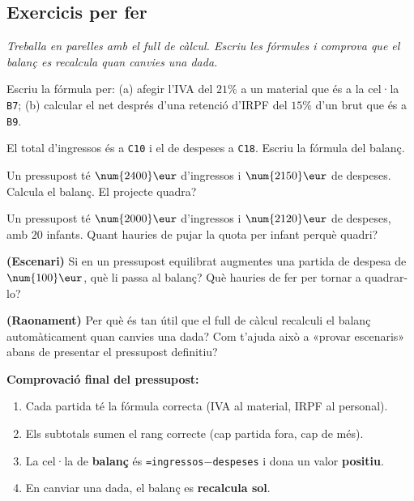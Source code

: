 \subsection{Exercicis per fer}

\noindent\textit{Treballa en parelles amb el full de càlcul. Escriu les fórmules i
comprova que el balanç es recalcula quan canvies una dada.}

\begin{exercicis}
\begin{exlist}
  \item Escriu la fórmula per: (a) afegir l'IVA del $21\%$ a un material que és a la
        cel·la \texttt{B7}; (b) calcular el net després d'una retenció d'IRPF del
        $15\%$ d'un brut que és a \texttt{B9}.
  \item El total d'ingressos és a \texttt{C10} i el de despeses a \texttt{C18}. Escriu
        la fórmula del balanç.
  \item Un pressupost té $\num{2400}\eur$ d'ingressos i $\num{2150}\eur$ de despeses.
        Calcula el balanç. El projecte quadra?
  \item Un pressupost té $\num{2000}\eur$ d'ingressos i $\num{2120}\eur$ de despeses,
        amb $20$ infants. Quant hauries de pujar la quota per infant perquè quadri?
  \item \textbf{(Escenari)} Si en un pressupost equilibrat augmentes una partida de
        despesa de $\num{100}\eur$, què li passa al balanç? Què hauries de fer per
        tornar a quadrar-lo?
  \item \textbf{(Raonament)} Per què és tan útil que el full de càlcul recalculi el
        balanç automàticament quan canvies una dada? Com t'ajuda això a «provar
        escenaris» abans de presentar el pressupost definitiu?
\end{exlist}
\end{exercicis}

\begin{idea}
\textbf{Comprovació final del pressupost:}
\begin{enumerate}[leftmargin=1.6em, itemsep=1pt]
  \item Cada partida té la fórmula correcta (IVA al material, IRPF al personal).
  \item Els subtotals sumen el rang correcte (cap partida fora, cap de més).
  \item La cel·la de \textbf{balanç} és \texttt{=ingressos$-$despeses} i dona un valor
        \textbf{positiu}.
  \item En canviar una dada, el balanç es \textbf{recalcula sol}.
\end{enumerate}
\end{idea}

